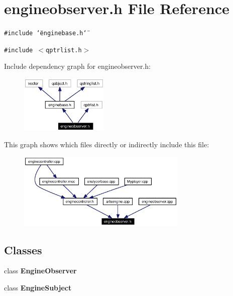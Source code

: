 \section{engineobserver.h File Reference}
\label{engineobserver_8h}


{\tt \#include \char`\"{}enginebase.h\char`\"{}}\par
{\tt \#include $<$qptrlist.h$>$}\par


Include dependency graph for engineobserver.h:\begin{figure}[H]
\begin{center}
\leavevmode
\includegraphics[width=119pt]{engineobserver_8h__incl}
\end{center}
\end{figure}


This graph shows which files directly or indirectly include this file:\begin{figure}[H]
\begin{center}
\leavevmode
\includegraphics[width=229pt]{engineobserver_8h__dep__incl}
\end{center}
\end{figure}
\subsection*{Classes}
\begin{CompactItemize}
\item 
class {\bf Engine\-Observer}
\item 
class {\bf Engine\-Subject}
\end{CompactItemize}
